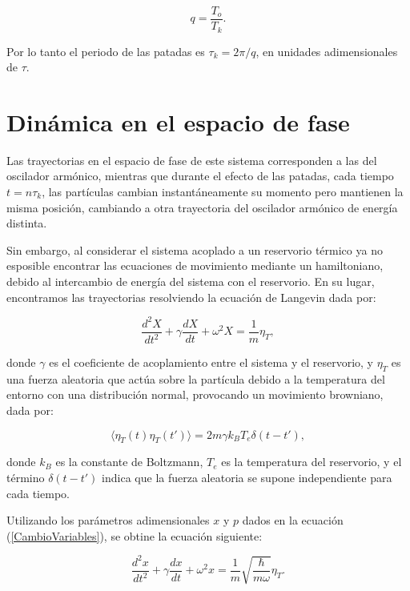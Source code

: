\documentclass[letterpaper,12pt,oneside]{book}
\begin{document}
	\begin{equation}
		q = \frac{T_o}{T_k}.
	\end{equation}
	
	Por lo tanto el periodo de las patadas es $\tau_k = 2\pi/q$, en unidades adimensionales de $\tau$.
	
	\section{Din\'amica en el espacio de fase}
	
	Las trayectorias en el espacio de fase de este sistema corresponden a las del oscilador arm\'onico, mientras que durante el efecto de las patadas, cada tiempo $t = n\tau_k$, las part\'iculas cambian instant\'aneamente su momento pero mantienen la misma posici\'on, cambiando a otra trayectoria del oscilador arm\'onico de energ\'ia distinta.
	
	Sin embargo, al considerar el sistema acoplado a un reservorio t\'ermico ya no esposible encontrar las ecuaciones de movimiento mediante un hamiltoniano, debido al intercambio de energ\'ia del sistema con el reservorio. En su lugar, encontramos las trayectorias resolviendo la ecuaci\'on de Langevin dada por: 
	
	\begin{equation}\label{LangevinOriginal}
		\frac{d^2X}{dt^2} + {\gamma}\frac{dX}{dt} + \omega^2 X = \frac{1}{m}\eta_T,
	\end{equation}
	
	\noindent donde $\gamma$ es el coeficiente de acoplamiento entre el sistema y el reservorio, y $\eta_T$ es una fuerza aleatoria que act\'ua sobre la part\'icula debido a la temperatura del entorno  con una distribuci\'on normal, provocando un movimiento browniano, dada por:
	
	\begin{equation}\label{EtaTemperatura}
		\langle \eta_T(t)\eta_T(t') \rangle = 2m\gamma k_B T_e\delta(t-t'),
	\end{equation}
	
	\noindent donde $k_B$ es la constante de Boltzmann, $T_e$ es la temperatura del reservorio, y el t\'ermino $\delta(t-t')$ indica que la fuerza aleatoria se supone independiente para cada tiempo.
	
	Utilizando los par\'ametros adimensionales $x$ y $p$ dados en la ecuaci\'on (\ref{CambioVariables}), se obtine la ecuaci\'on siguiente:
	
	\begin{equation}
		\frac{d^2x}{dt^2} +  {\gamma}\frac{dx}{dt} + \omega^2x = \frac{1}{m} \sqrt{\frac{\hbar}{m\omega}} \eta_T.
	\end{equation} 
	
\end{document}
